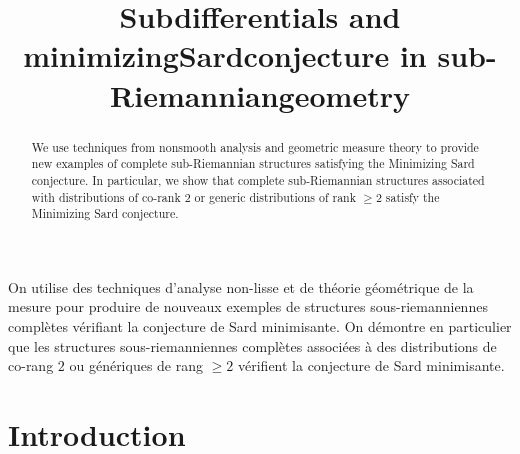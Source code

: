 \documentclass[JEP,XML,SOM,Unicode,NoFloatCountersInSection,published]{cedram}
\theoremstyle{definition}
\begin{document}
\frontmatter
\title[Subdifferentials and minimizing Sard conjecture in sub-Riemannian geometry]{Subdifferentials and minimizing\nobreakspace Sard\nobreakspace conjecture in sub-Riemannian\nobreakspace geometry}

\author[\initial{L.} \lastname{Rifford}]{ }
\address{Université Côte d'Azur, CNRS, Labo.\ J.-A.\ Dieudonné, UMR CNRS 7351\\
Parc Valrose, 06108 Nice Cedex 02, France}


\begin{abstract}
We use techniques from nonsmooth analysis and geometric measure theory to provide new examples of complete sub-Riemannian structures satisfying the Minimizing Sard conjecture. In particular, we show that complete sub-Riemannian structures associated with distributions of co-rank $2$ or generic distributions of rank $\geq 2$ satisfy the Minimizing Sard conjecture.
\end{abstract}





\begin{altabstract}
On utilise des techniques d’analyse non-lisse et de théorie géométrique de la mesure pour produire de nouveaux exemples de structures sous-riemanniennes complètes vérifiant la conjecture de Sard minimisante. On démontre en particulier que les structures sous-riemanniennes complètes associées à des distributions de co-rang $2$ ou génériques de rang $\geq 2$ vérifient la conjecture de Sard minimisante.
\end{altabstract}

\maketitle
\vspace*{-5pt}
\tableofcontents
\mainmatter

\section{Introduction}\label{sec:Intro}
\end{document}

